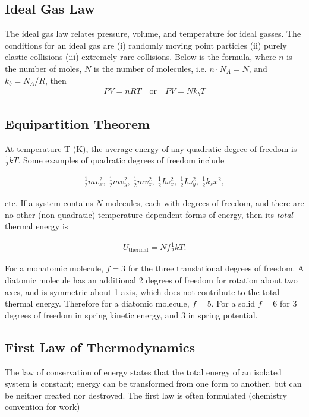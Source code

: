 \documentclass{article}
\begin{document}
\subsection{Ideal Gas Law}
\indent The ideal gas law relates pressure, volume, and temperature for ideal gasses. The conditions for an ideal gas are (i) randomly moving point particles (ii) purely elastic collisions (iii) extremely rare collisions. Below is the formula, where $n$ is the number of moles, $N$ is the number of molecules, i.e. $n \cdot N_{A} = N$, and $k_{b} = N_{A} / R$, then
\begin{gather*}
    PV = nRT \quad \text{or} \quad PV = Nk_{b}T
\end{gather*}

\subsection{Equipartition Theorem} 
\indent At temperature T (K), the average energy of any quadratic degree of freedom is $\frac{1}{2}kT$. Some examples of quadratic degrees of freedom include

\begin{gather*}
    \frac{1}{2}mv_{x}^{2},\ \frac{1}{2}mv_{y}^2,\ \frac{1}{2}mv_{z}^2,\ \frac{1}{2}I\omega_{x}^2,\ \frac{1}{2}I\omega_{y}^2,\ \frac{1}{2}k_{s}x^2,
\end{gather*}

\noindent etc. If a system contains $N$ molecules, each with degrees of freedom, and there are no other (non-quadratic) temperature dependent forms of energy, then its \textit{total} thermal energy is

\begin{gather*}
    U_{\text{thermal}} = N f\frac{1}{2}k T.
\end{gather*}

\indent For a monatomic molecule, $f = 3$ for the three translational degrees of freedom. A diatomic molecule has an additional 2 degrees of freedom for rotation about two axes, and is symmetric about 1 axis, which does not contribute to the total thermal energy. Therefore for a diatomic molecule, $f = 5$. For a solid $f=6$ for 3 degrees of freedom in spring kinetic energy, and 3 in spring potential. \\


\subsection{First Law of Thermodynamics}
\indent The law of conservation of energy states that the total energy of an isolated system is constant; energy can be transformed from one form to another, but can be neither created nor destroyed. The first law is often formulated (chemistry convention for work)
\end{document}

